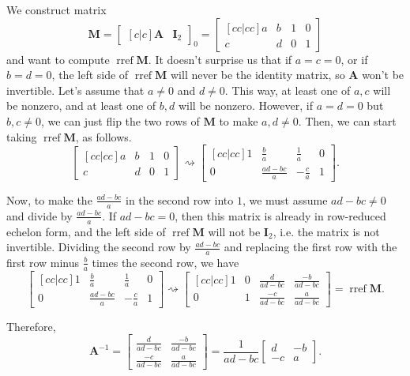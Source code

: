 \documentclass[]{book}
\DeclareMathOperator{\rref}{rref}
\newcommand{\inv}[1]{\ensuremath{{#1}^{-1}}}
\newcommand{\invm}[1]{\ensuremath{\inv{\mat{#1}}}}
\newcommand{\mat}[1]{\ensuremath{\mathbf{#1}}}
\newcommand{\idmat}[1][n]{\ensuremath{\mat{I}_#1}}
\begin{document}
We construct matrix 
\[\mat{M} = \begin{bmatrix}[c|c] \mat{A} & \idmat[2] \end{bmatrix}_0 = \begin{bmatrix}[cc|cc] a & b & 1 & 0 \\ c & d & 0 & 1 \end{bmatrix}\] and want to compute $\rref\mat{M}$. It doesn't surprise us that if $a=c=0$, or if $b=d=0$, the left side of $\rref\mat{M}$ will never be the identity matrix, so $\mat{A}$ won't be invertible. Let's assume that $a \neq 0$ and $d \neq 0$. This way, at least one of $a,c$ will be nonzero, and at least one of $b,d$ will be nonzero. However, if $a = d = 0$ but $b,c \neq 0$, we can just flip the two rows of $\mat{M}$ to make $a,d \neq 0$. Then, we can start taking $\rref\mat{M}$, as follows.
\[\begin{bmatrix}[cc|cc] a & b & 1 & 0 \\ c & d & 0 & 1 \end{bmatrix} \rightsquigarrow \begin{bmatrix}[cc|cc]\boxed{1} & \frac{b}{a} & \frac{1}{a} & 0 \\ 0 & \frac{ad-bc}{a} & -\frac{c}{a} & 1\end{bmatrix}.\]

Now, to make the $\frac{ad-bc}{a}$ in the second row into $1$, we must assume $ad-bc \neq 0$ and divide by $\frac{ad - bc}{a}$. If $ad-bc = 0$, then this matrix is already in row-reduced echelon form, and the left side of $\rref\mat{M}$ will not be $\idmat[2]$, i.e. the matrix is not invertible. Dividing the second row by $\frac{ad - bc}{a}$ and replacing the first row with the first row minus $\frac{b}{a}$ times the second row, we have
\[\begin{bmatrix}[cc|cc]\boxed{1} & \frac{b}{a} & \frac{1}{a} & 0 \\ 0 & \frac{ad-bc}{a} & -\frac{c}{a} & 1\end{bmatrix} \rightsquigarrow \begin{bmatrix}[cc|cc]\boxed{1} & 0 & \frac{d}{ad-bc} & \frac{-b}{ad-bc} \\ 0 & \boxed{1} & \frac{-c}{ad-bc} & \frac{a}{ad-bc}\end{bmatrix} = \rref\mat{M}.\]

Therefore, \[\invm{A} = \begin{bmatrix}\frac{d}{ad-bc} & \frac{-b}{ad-bc} \\ \frac{-c}{ad-bc} & \frac{a}{ad-bc} \end{bmatrix} = \frac{1}{ad-bc} \begin{bmatrix}d & -b \\ -c & a \end{bmatrix}.\]
\end{document}
